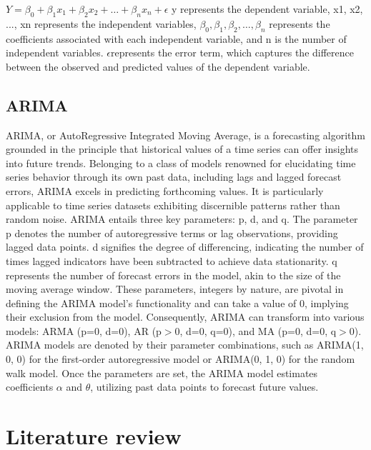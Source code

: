 \documentclass[conference,onecolumn,11pt]{IEEEtran}
\begin{document}
$Y = \beta_0+\beta_1 x_1 + \beta_2 x_2 + \ldots+\beta_n x_n + \epsilon$
y represents the dependent variable, x1, x2, ..., xn represents the independent variables, $\beta_0,\beta_1,\beta_2,\ldots,\beta_n$ represents the coefficients associated with each independent variable, and n is the number of independent variables. $\epsilon$represents the error term, which captures the difference between the observed and predicted values of the dependent variable.


\subsection*{ARIMA}

ARIMA, or AutoRegressive Integrated Moving Average, is a forecasting algorithm grounded in the principle that historical values of a time series can offer insights into future trends. Belonging to a class of models renowned for elucidating time series behavior through its own past data, including lags and lagged forecast errors, ARIMA excels in predicting forthcoming values. It is particularly applicable to time series datasets exhibiting discernible patterns rather than random noise. ARIMA entails three key parameters: p, d, and q. The parameter p denotes the number of autoregressive terms or lag observations, providing lagged data points. d signifies the degree of differencing, indicating the number of times lagged indicators have been subtracted to achieve data stationarity. q represents the number of forecast errors in the model, akin to the size of the moving average window. These parameters, integers by nature, are pivotal in defining the ARIMA model's functionality and can take a value of 0, implying their exclusion from the model. Consequently, ARIMA can transform into various models: ARMA (p=0, d=0), AR (p$>$0, d=0, q=0), and MA (p=0, d=0, q$>$0). ARIMA models are denoted by their parameter combinations, such as ARIMA(1, 0, 0) for the first-order autoregressive model or ARIMA(0, 1, 0) for the random walk model. Once the parameters are set, the ARIMA model estimates coefficients $\alpha$ and $\theta$, utilizing past data points to forecast future values.

\section{Literature review}
\end{document}
